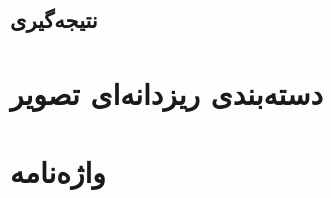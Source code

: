 \documentclass[11pt]{article}
\begin{document}
\subsection{نتیجه‌گیری}
\section{دسته‌بندی ریزدانه‌ای تصویر}\label{sec:fg_class}

\linespread{1}
\small
\setlength{\parskip}{0pt}
\setlength{\parsep}{0pt}

\renewcommand{\bibname}{مراجع}
\begin{latin}

%

\end{latin}



\section*{واژه‌نامه}
\begin{multicols}{3}
\theendnotes 
\end{multicols}
\end{document}
